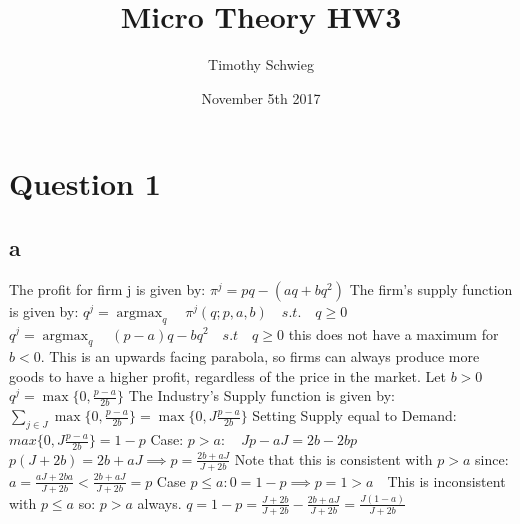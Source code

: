 \documentclass[10pt, letterpaper]{paper}
\title{ Micro Theory HW3 }
\author{ Timothy Schwieg }
\date{ November 5th 2017 }
\DeclareMathOperator*{\maxi}{argmax}
\begin{document}
\maketitle


\section*{Question 1}
\subsection*{a}
The profit for firm j is given by: $\pi^j = pq - (aq + bq^2)$
\newline
The firm's supply function is given by:
 $q^j= \maxi_{q} \quad \pi^j ( q; p,a,b) \quad s.t. \quad q \geq 0$
\newline
$q^j= \maxi_{q} \quad (p-a)q - bq^2 \quad s.t \quad q \geq 0$  this does not have a maximum for $b < 0$. This is an upwards facing parabola, so firms can always produce more goods to have a higher profit, regardless of the price in the market.
\newline
Let $b > 0$
$q^j = \max\{ 0, \frac{ p - a }{2b} \}$
\newline
The Industry's Supply function is given by: $\sum_{j \in J} \max\{ 0, \frac{ p-a}{2b} \} = \max\{ 0, J \frac{ p-a}{2b}\}$
\newline
Setting Supply equal to Demand:
$max\{ 0, J \frac{ p-a}{2b}\} = 1 - p$
\newline
Case: $p > a: \quad Jp - aJ = 2b - 2bp$
\newline
$p( J + 2b) = 2b + aJ \implies p = \frac{ 2b + aJ }{J + 2b}$
\newline
Note that this is consistent with $p > a$ since: $ a = \frac{ aJ + 2ba }{J + 2b} < \frac{2b + aJ}{J + 2b} = p$
\newline
Case $p \leq a: 0 = 1-p \implies p = 1 > a \quad$This is inconsistent with $p \leq a$ so: $p > a$ always.
\newline
$q = 1- p = \frac{ J + 2b }{ J + 2b} - \frac{ 2b + aJ }{J + 2b} = \frac{ J(1-a)}{J + 2b}$
\newline
\end{document}

